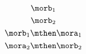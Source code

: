 {\begin{forslides}
    \begin{equation}
        \label{eq:g1}
        \morb_1
    \end{equation}
    \begin{equation}
        \label{eq:g2}
        \morb_2
    \end{equation}
    \begin{equation}
        \label{eq:g1f1}
        \morb_1\mthen \mora_1
    \end{equation}
    \begin{equation}
        \label{eq:f2g2}
        \mora_2\mthen \morb_2
    \end{equation}
    
\end{forslides}

}
